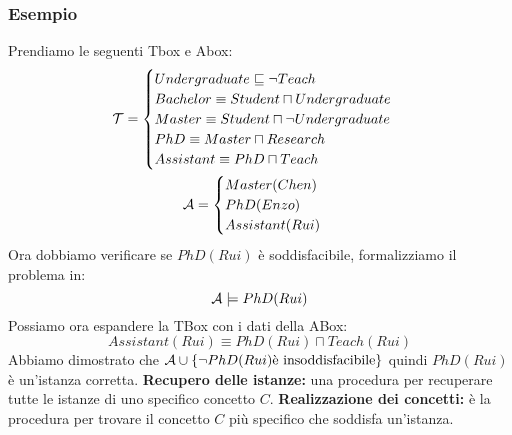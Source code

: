 \documentclass[../main.tex]{subfiles}
\begin{document}
   \subsubsection{Esempio}
   Prendiamo le seguenti Tbox e Abox:
   \begin{gather*}
      \mathcal{T}=
      \begin{cases}
         Undergraduate \sqsubseteq \lnot Teach\\
         Bachelor \equiv Student \sqcap Undergraduate\\
         Master \equiv Student \sqcap \lnot Undergraduate\\
         PhD \equiv Master \sqcap Research\\
         Assistant \equiv PhD \sqcap Teach\\
      \end{cases}\\
      \mathcal{A}=
      \begin{cases}
         Master(Chen)\\
         PhD(Enzo)\\
         Assistant(Rui)
      \end{cases}
   \end{gather*}
   Ora dobbiamo verificare se $PhD(Rui)$ è soddisfacibile, formalizziamo il problema in:
   \begin{equation*}
      \mathcal{A} \models PhD(Rui)
   \end{equation*}
   Possiamo ora espandere la TBox con i dati della ABox:
   \begin{equation*}
      Assistant(Rui) \equiv PhD(Rui) \sqcap Teach(Rui)
   \end{equation*}
   Abbiamo dimostrato che $\mathcal{A} \cup \{\lnot PhD(Rui) \text{è insoddisfacibile} \}$ quindi $PhD(Rui)$ è un'istanza corretta.
   \spazio
   \textbf{Recupero delle istanze:} una procedura per recuperare tutte le istanze di uno specifico concetto $C$.
   \spazio
   \textbf{Realizzazione dei concetti:} è la procedura per trovare il concetto $C$ più specifico che soddisfa un'istanza.
\end{document}
